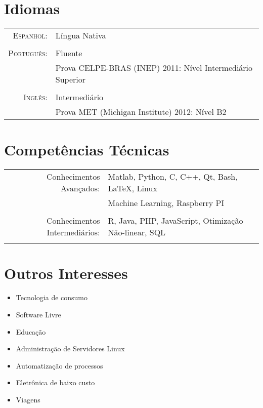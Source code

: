 \documentclass[a4paper,10pt]{article}
\begin{document}
\section{Idiomas}

\begin{longtable}{rl}
    \textsc{Espanhol:}      & Língua Nativa\\
                            &\\
    \textsc{Português:}     & Fluente\\
                            & Prova \textsc{CELPE-BRAS} (INEP) 2011: Nível Intermediário Superior\\
                            &\\
    \textsc{Inglês:}        & Intermediário\\
                            & Prova \textsc{MET} (Michigan Institute) 2012: Nível B2 \\
\end{longtable}

\section{Competências Técnicas}
\begin{longtable}{rl}

    Conhecimentos Avançados:        & Matlab, Python, C, C++, Qt, Bash, \LaTeX, Linux\\
                                    & Machine Learning, Raspberry PI\\
                                    &\\

    Conhecimentos Intermediários:   & R, Java, PHP, JavaScript, Otimização Não-linear, SQL\\
                                    &\\

\end{longtable}

\section{Outros Interesses}

\begin{itemize}
    \item Tecnologia de consumo
    \item Software Livre
    \item Educação
    \item Administração de Servidores Linux
    \item Automatização de processos
    \item Eletrônica de baixo custo
    \item Viagens
\end{itemize}



\vfill
\hrulefill\\
\center{\footnotesize{\today}}
\end{document}
